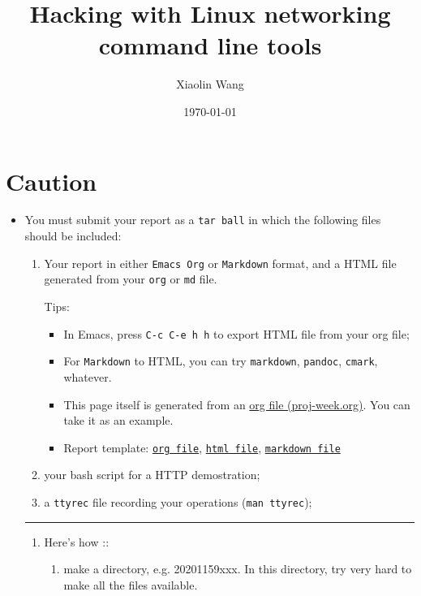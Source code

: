 \documentclass{article} [NO-DEFAULT-PACKAGES] \usepackage{wx672hyperref}
\author{Xiaolin Wang}
\date{\today}
\title{Hacking with Linux networking command line tools}
\begin{document}
\maketitle
\tableofcontents


\section{Caution}
\label{sec:orgbcfde5a}
\begin{itemize}
\item You must submit your report as a \texttt{tar ball} in which the following files should be
included:

\begin{enumerate}
\item Your report in either \texttt{Emacs Org} or \texttt{Markdown} format, and a HTML file
generated from your \texttt{org} or \texttt{md} file.

Tips: 
\begin{itemize}
\item In Emacs, press \texttt{C-c C-e h h} to export HTML file from your org file;

\item For \texttt{Markdown} to HTML, you can try \texttt{markdown}, \texttt{pandoc}, \texttt{cmark}, whatever.

\item This page itself is generated from an \href{proj-week.org}{org file (proj-week.org)}. You can take it
as an example.

\item Report template: \href{20201152xxx.org}{\texttt{org file}}, \href{20201152xxx.html}{\texttt{html file}}, \href{20201152xxx.md}{\texttt{markdown file}}
\end{itemize}

\item your bash script for a HTTP demostration;

\item a \texttt{ttyrec} file recording your operations (\texttt{man ttyrec});
\end{enumerate}

\noindent\rule{\textwidth}{0.5pt}
\begin{enumerate}
\item Here's how :: 
\begin{enumerate}
\item make a directory, e.g. 20201159xxx. In this directory, try very hard to make all
the files available.


\end{enumerate}
\end{enumerate}
\end{itemize}
\end{document}
